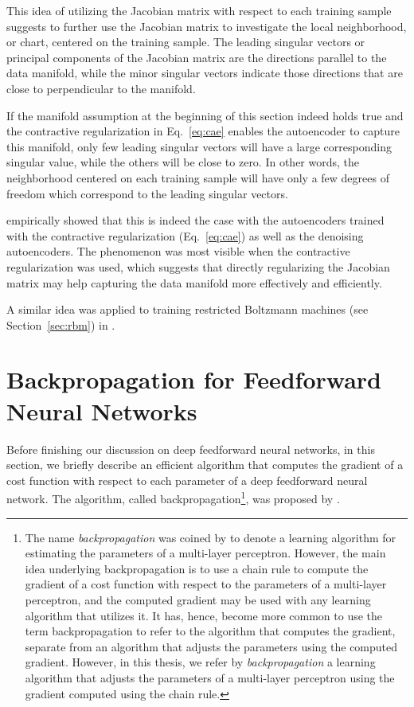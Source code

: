 \documentclass[dissertation,nocontribution,draft*]{aaltoseries}
\begin{document}
This idea of utilizing the Jacobian matrix with respect to
each training sample suggests to further use the Jacobian
matrix to investigate the local neighborhood, or chart,
centered on the training sample. The leading singular
vectors or principal components of the Jacobian matrix are
the directions parallel to the data manifold, while the
minor singular vectors indicate those directions that are
close to perpendicular to the manifold.

If the manifold assumption at the beginning of this section
indeed holds true and the contractive regularization in
Eq.~\eqref{eq:cae} enables the autoencoder to capture this
manifold, only few leading singular vectors will have a large
corresponding singular value, while the others will be
close to zero. In other words, the neighborhood
centered on each training sample will have only a few
degrees of freedom which correspond to the leading singular
vectors.

\citet{Rifai2011} empirically showed that this is indeed the
case with the autoencoders trained with the contractive
regularization (Eq.~\eqref{eq:cae}) as well as the denoising
autoencoders. The phenomenon was most visible when the
contractive regularization was used, which suggests that
directly regularizing the Jacobian matrix may help capturing
the data manifold more effectively and efficiently.

A similar idea was applied to training restricted Boltzmann
machines (see Section~\ref{sec:rbm}) in
.


\section{Backpropagation for Feedforward Neural Networks}
\label{sec:backprop}

Before finishing our discussion on deep feedforward neural
networks, in this section, we briefly describe an efficient
algorithm that computes the gradient of a cost function with
respect to each parameter of a deep feedforward neural
network. The algorithm, called backpropagation\footnote{
The name \textit{backpropagation} was coined by
\citet{Rumelhart1986} to denote a learning algorithm for
estimating the parameters of a multi-layer perceptron.
However, the main idea underlying backpropagation is to use
a chain rule to compute the gradient of a cost function with
respect to the parameters of a multi-layer perceptron, and
the computed gradient may be used with any learning
algorithm that utilizes it. It has, hence, become more
common to use the term backpropagation to refer to the
algorithm that computes the gradient, separate from an
algorithm that adjusts the parameters using the computed
gradient.  However, in this thesis, we refer by
\textit{backpropagation} a learning algorithm that adjusts
the parameters of a multi-layer perceptron using the
gradient computed using the chain rule.
}, was proposed
by \citet{Rumelhart1986}.
\end{document}

